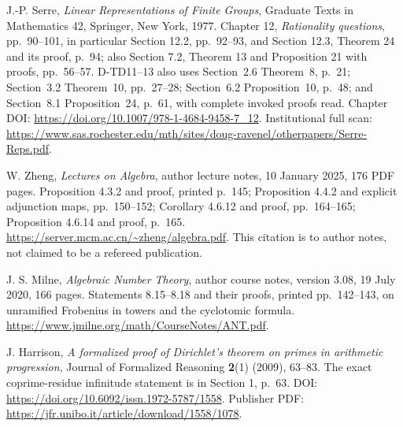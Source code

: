 J.-P. Serre, \emph{Linear Representations of Finite Groups},
Graduate Texts in Mathematics 42, Springer, New York, 1977.
Chapter 12, \emph{Rationality questions}, pp.~90--101,
in particular Section 12.2, pp.~92--93, and Section 12.3,
Theorem 24 and its proof, p.~94; also Section 7.2,
Theorem 13 and Proposition 21 with proofs, pp.~56--57.
D-TD11--13 also uses Section~2.6 Theorem~8, p.~21; Section~3.2 Theorem~10, pp.~27--28; Section~6.2 Proposition~10, p.~48; and Section~8.1 Proposition~24, p.~61, with complete invoked proofs read.
Chapter DOI: \url{https://doi.org/10.1007/978-1-4684-9458-7_12}.
Institutional full scan:
\url{https://www.sas.rochester.edu/mth/sites/doug-ravenel/otherpapers/Serre-Reps.pdf}.

W. Zheng, \emph{Lectures on Algebra}, author lecture notes,
10 January 2025, 176 PDF pages.
Proposition 4.3.2 and proof, printed p.~145;
Proposition 4.4.2 and explicit adjunction maps, pp.~150--152;
Corollary 4.6.12 and proof, pp.~164--165;
Proposition 4.6.14 and proof, p.~165.
\url{https://server.mcm.ac.cn/~zheng/algebra.pdf}.
This citation is to author notes, not claimed to be a refereed publication.

J. S. Milne, \emph{Algebraic Number Theory},
author course notes, version 3.08, 19 July 2020, 166 pages.
Statements 8.15--8.18 and their proofs,
printed pp.~142--143, on unramified Frobenius in towers and
the cyclotomic formula.
\url{https://www.jmilne.org/math/CourseNotes/ANT.pdf}.

J. Harrison, \emph{A formalized proof of Dirichlet's theorem
on primes in arithmetic progression},
Journal of Formalized Reasoning \textbf{2}(1) (2009), 63--83.
The exact coprime-residue infinitude statement is in
Section 1, p.~63.
DOI: \url{https://doi.org/10.6092/issn.1972-5787/1558}.
Publisher PDF: \url{https://jfr.unibo.it/article/download/1558/1078}.

